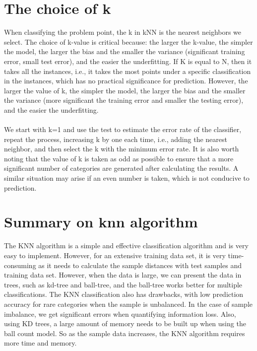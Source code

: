     \section{The choice of k}
    When classifying the problem point, the k in kNN is the nearest neighbors we select. The choice of k-value is critical because: the larger the k-value, the simpler the model, the larger the bias and the smaller the variance (significant training error, small test error), and the easier the underfitting. If K is equal to N, then it takes all the instances, i.e., it takes the most points under a specific classification in the instances, which has no practical significance for prediction. However, the larger the value of k, the simpler the model, the larger the bias and the smaller the variance (more significant the training error and smaller the testing error), and the easier the underfitting. \cite{kozma2008k,steinbach2009knn,landau2011cluster,hall2008choice}
    \\ \hspace*{\fill} \\
    We start with k=1 and use the test to estimate the error rate of the classifier, repeat the process, increasing k by one each time, i.e., adding the nearest neighbor, and then select the k with the minimum error rate. It is also worth noting that the value of k is taken as odd as possible to ensure that a more significant number of categories are generated after calculating the results. A similar situation may arise if an even number is taken, which is not conducive to prediction. \cite{deng2016efficient, steinbach2009knn}
    
    
    \section{Summary on knn algorithm}
  The KNN algorithm is a simple and effective classification algorithm and is very easy to implement. However, for an extensive training data set, it is very time-consuming as it needs to calculate the sample distances with test samples and training data set. However, when the data is large, we can present the data in trees, such as kd-tree and ball-tree, and the ball-tree works better for multiple classifications.\cite{10.1145/361002.361007,Omohundro89fiveballtree} The KNN classification also has drawbacks, with low prediction accuracy for rare categories when the sample is unbalanced. In the case of sample imbalance, we get significant errors when quantifying information loss. Also, using KD trees, a large amount of memory needs to be built up when using the ball count model. So as the sample data increases, the KNN algorithm requires more time and memory.
    
